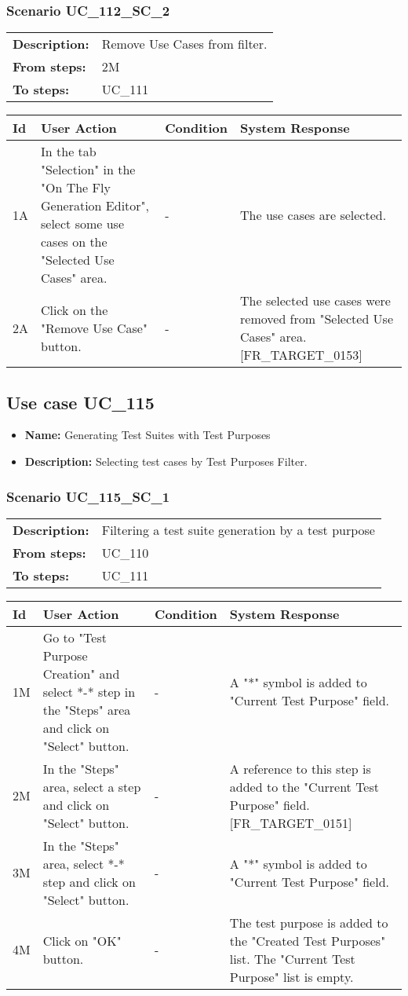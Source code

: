 \documentclass[a4paper,11pt]{article}
\newcommand{\bl}{\\ \hline}
\begin{document}
\subsubsection*{Scenario UC_112_SC_2}
\begin{tabular}{p{1in}p{4in}}
{\bf Description:} & Remove Use Cases from filter. \\
{\bf From steps:} & 2M \\
{\bf To steps:} & UC_111#2M \\
\end{tabular}
 
\begin{tabular}{|p{0.8in}|p{1.6in}|p{1.6in}|p{1.6in}|}
\hline
Id & User Action & Condition & System Response  \bl 
1A & In the tab "Selection" in the "On The Fly Generation Editor", select some use cases on the "Selected Use Cases" area. & - & The use cases are selected. \bl 
2A & Click on the "Remove Use Case" button. & - & The selected use cases were removed from "Selected Use Cases" area. [FR_TARGET_0153] \bl 
\end{tabular}
\subsection*{Use case UC_115}
\begin{itemize}
\item {\bf Name: }Generating Test Suites with Test Purposes
\item {\bf Description: }Selecting test cases by Test Purposes Filter.
\end{itemize}
\subsubsection*{Scenario UC_115_SC_1}
\begin{tabular}{p{1in}p{4in}}
{\bf Description:} & Filtering a test suite generation by a test purpose \\
{\bf From steps:} & UC_110#2M \\
{\bf To steps:} & UC_111#2M \\
\end{tabular}
 
\begin{tabular}{|p{0.8in}|p{1.6in}|p{1.6in}|p{1.6in}|}
\hline
Id & User Action & Condition & System Response  \bl 
1M & Go to "Test Purpose Creation" and select *-*  step in the "Steps" area and click on "Select" button. & - & A "*" symbol is added to "Current Test Purpose" field. \bl 
2M & In the "Steps" area, select a step and click on "Select" button. & - & A reference to this step is added to the "Current Test Purpose" field.  [FR_TARGET_0151] \bl 
3M & In the "Steps" area, select *-*  step and click on "Select" button. & - & A "*" symbol is added to "Current Test Purpose" field. \bl 
4M & Click on "OK" button. & - & The test purpose is added to the "Created Test Purposes" list. The "Current Test Purpose" list is empty. \bl 
\end{tabular}
\end{document}
